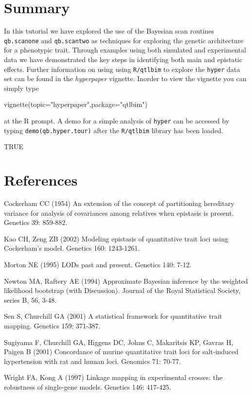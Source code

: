 \documentclass[12pt]{article}
\begin{document}
\section{Summary}
In this tutorial we have explored the use of the Bayesian scan routines 
{\tt qb.scanone} and {\tt qb.scantwo} as techniques for exploring the
genetic architecture for a phenotypic trait.  Through examples using 
both simulated and experimental data we have demonstrated the key steps in
identifying both main and epistatic effects.  Further information on using 
using {\tt R/qtlbim} to explore the {\tt hyper} data set can be found in the 
{\it hyperpaper} vignette.  Inorder to view the vignette you can simply type
\begin{Schunk}
\begin{Sinput}
vignette(topic="hyperpaper",package="qtlbim")
\end{Sinput}
\end{Schunk}
at the R prompt.
A demo for a simple analysis of {\tt hyper} can be accessed by typing 
{\tt demo(qb.hyper.tour)} after the {\tt R/qtlbim} library has been loaded.  

\begin{Schunk}
\begin{Soutput}
[1] TRUE
\end{Soutput}
\end{Schunk}

\section*{References}

Cockerham CC (1954) An extension of the concept of partitioning
hereditary variance for analysis of covariances among relatives when
epistasis is present. Genetics 39: 859-882. 

Kao CH, Zeng ZB (2002) Modeling epistasis of quantitative trait loci
using Cockerham's model. Genetics 160: 1243-1261.

Morton NE (1995) LODs past and present. Genetics 140: 7-12.

Newton MA, Raftery AE (1994) Approximate Bayesian inference by the
weighted likelihood bootstrap (with Discussion). Journal of the Royal
Statistical Society, series B, 56, 3-48.

Sen S, Churchill GA (2001) A statistical framework for quantitative
trait mapping. Genetics 159: 371-387. 

Sugiyama F, Churchill GA, Higgens DC, Johns C, Makaritsis KP, Gavras
H, Paigen B (2001) Concordance of murine quantitative trait loci for
salt-induced hypertension with rat and human loci. Genomics 71: 70-77.

Wright FA, Kong A (1997) Linkage mapping in experimental crosses: the
robustness of single-gene models. Genetics 146: 417-425. 
\end{document}
